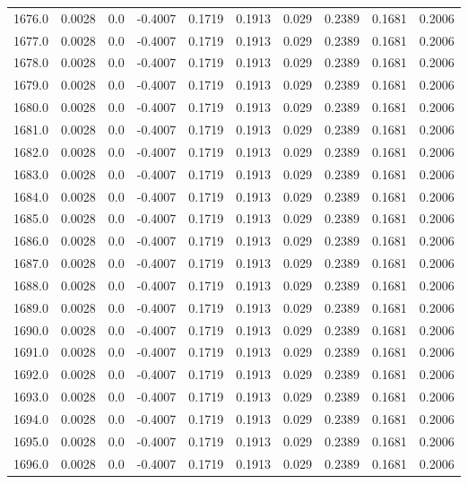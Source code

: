 \begin{longtable}{lrrrrrrrrr}
1676.0 & 0.0028 & 0.0 & -0.4007 & 0.1719 & 0.1913 & 0.029 & 0.2389 & 0.1681 & 0.2006 \\
1677.0 & 0.0028 & 0.0 & -0.4007 & 0.1719 & 0.1913 & 0.029 & 0.2389 & 0.1681 & 0.2006 \\
1678.0 & 0.0028 & 0.0 & -0.4007 & 0.1719 & 0.1913 & 0.029 & 0.2389 & 0.1681 & 0.2006 \\
1679.0 & 0.0028 & 0.0 & -0.4007 & 0.1719 & 0.1913 & 0.029 & 0.2389 & 0.1681 & 0.2006 \\
1680.0 & 0.0028 & 0.0 & -0.4007 & 0.1719 & 0.1913 & 0.029 & 0.2389 & 0.1681 & 0.2006 \\
1681.0 & 0.0028 & 0.0 & -0.4007 & 0.1719 & 0.1913 & 0.029 & 0.2389 & 0.1681 & 0.2006 \\
1682.0 & 0.0028 & 0.0 & -0.4007 & 0.1719 & 0.1913 & 0.029 & 0.2389 & 0.1681 & 0.2006 \\
1683.0 & 0.0028 & 0.0 & -0.4007 & 0.1719 & 0.1913 & 0.029 & 0.2389 & 0.1681 & 0.2006 \\
1684.0 & 0.0028 & 0.0 & -0.4007 & 0.1719 & 0.1913 & 0.029 & 0.2389 & 0.1681 & 0.2006 \\
1685.0 & 0.0028 & 0.0 & -0.4007 & 0.1719 & 0.1913 & 0.029 & 0.2389 & 0.1681 & 0.2006 \\
1686.0 & 0.0028 & 0.0 & -0.4007 & 0.1719 & 0.1913 & 0.029 & 0.2389 & 0.1681 & 0.2006 \\
1687.0 & 0.0028 & 0.0 & -0.4007 & 0.1719 & 0.1913 & 0.029 & 0.2389 & 0.1681 & 0.2006 \\
1688.0 & 0.0028 & 0.0 & -0.4007 & 0.1719 & 0.1913 & 0.029 & 0.2389 & 0.1681 & 0.2006 \\
1689.0 & 0.0028 & 0.0 & -0.4007 & 0.1719 & 0.1913 & 0.029 & 0.2389 & 0.1681 & 0.2006 \\
1690.0 & 0.0028 & 0.0 & -0.4007 & 0.1719 & 0.1913 & 0.029 & 0.2389 & 0.1681 & 0.2006 \\
1691.0 & 0.0028 & 0.0 & -0.4007 & 0.1719 & 0.1913 & 0.029 & 0.2389 & 0.1681 & 0.2006 \\
1692.0 & 0.0028 & 0.0 & -0.4007 & 0.1719 & 0.1913 & 0.029 & 0.2389 & 0.1681 & 0.2006 \\
1693.0 & 0.0028 & 0.0 & -0.4007 & 0.1719 & 0.1913 & 0.029 & 0.2389 & 0.1681 & 0.2006 \\
1694.0 & 0.0028 & 0.0 & -0.4007 & 0.1719 & 0.1913 & 0.029 & 0.2389 & 0.1681 & 0.2006 \\
1695.0 & 0.0028 & 0.0 & -0.4007 & 0.1719 & 0.1913 & 0.029 & 0.2389 & 0.1681 & 0.2006 \\
1696.0 & 0.0028 & 0.0 & -0.4007 & 0.1719 & 0.1913 & 0.029 & 0.2389 & 0.1681 & 0.2006 \\

\end{longtable}
